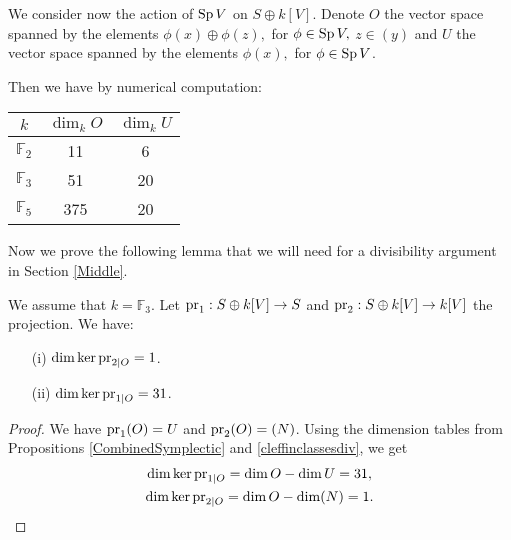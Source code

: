 We consider now the action of $\operatorname{Sp} V$ on $S\oplus k[V]$. 
Denote $O$ the vector space spanned by the elements $\phi(x)\oplus \phi(z),$ for $\phi \in \operatorname{Sp} V,$ $z \in (y)$
and $U$ the vector space spanned by the elements $\phi(x),$ for $\phi \in \operatorname{Sp} V$.
\begin{proposition}\label{CombinedSymplectic}
Then we have by numerical computation:
\vspace{2mm}
\begin{center}
\begin{tabular}{c||c|c}
 $k$ & $\dim_k O$  & $\dim_k U$\\
\hline
$\mathbb F_2$ & 11 & 6 \\
$\mathbb F_3$ & 51  & 20 \\
$\mathbb F_5$ & 375  & 20 
\end{tabular}
\end{center}
\end{proposition}
Now we prove the following lemma that we will need for a divisibility argument in Section \ref{Middle}.
\begin{lemme}\label{cleffinclassesdiv}
We assume that $k=\mathbb F_3$. Let $\operatorname{pr}_1: S\oplus k[V]\rightarrow S$ and $\operatorname{pr}_2: S\oplus k[V]\rightarrow k[V]$ the projection. 
We have: 
\begin{itemize}
\item[(i)]
$\dim \ker\operatorname{pr}_{2|O}=1$.
\item[(ii)]
$\dim \ker\operatorname{pr}_{1|O}=31$.
\end{itemize}
\end{lemme}
\begin{proof}
We have $\operatorname{pr}_{1}(O)=U$ and $\operatorname{pr}_{2}(O)=(N)$. Using the dimension tables from Propositions \ref{CombinedSymplectic} and \ref{cleffinclassesdiv}, we get
\begin{gather*}
\dim \ker\operatorname{pr}_{1|O} = \dim O - \dim U  = 31,\\
\dim \ker\operatorname{pr}_{2|O} = \dim O - \dim (N) = 1.
\end{gather*}

\end{proof}